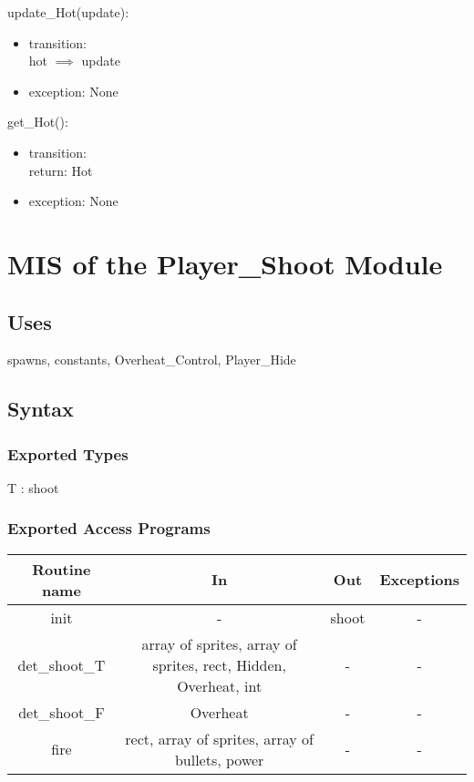 \documentclass[12pt, titlepage]{article}
\begin{document}
\noindent update\_Hot(update):
\begin{itemize}
\item transition:\\
hot $\implies$ update\\
\item exception: None
\end{itemize}

\noindent get\_Hot():
\begin{itemize}
\item transition:\\
return: Hot\\
\item exception: None
\end{itemize}

\section {MIS of the Player\_Shoot Module}

\subsection {Uses}

spawns, constants, Overheat\_Control, Player\_Hide

\subsection {Syntax}

\subsubsection {Exported Types}
T : shoot
\subsubsection {Exported Access Programs}

\begin{tabular}{| c | c | c | c |}
\hline
\textbf{Routine name} & \textbf{In} & \textbf{Out} & \textbf{Exceptions}\\
\hline
init & - & shoot & -  \\
\hline
det\_shoot\_T & array of sprites, array of sprites, rect, Hidden, Overheat, int & - & -\\
\hline
det\_shoot\_F & Overheat & - & -\\
\hline
fire & rect, array of sprites, array of bullets, power & - & -\\
\hline
\end{tabular}
\end{document}
